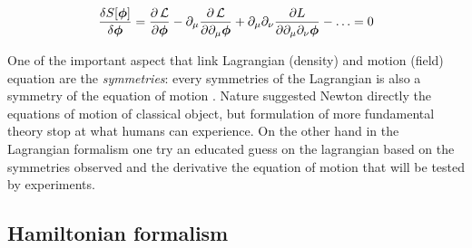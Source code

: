 \begin{equation} \label{eq:euler-lagrange-field}
  \frac{\delta S[\bm{\phi}]}{\delta \bm{\phi}} =
    \frac{\partial \operatorname{\mathcal{L}}}{\partial \bm{\phi}} -
    \partial_{\mu} \frac{\partial \operatorname{\mathcal{L}}}{\partial \partial_{\mu}\bm{\phi}} +
    \partial_{\mu}\partial_{\nu}\frac{\partial L}
    {\partial \partial_{\mu}\partial_{\nu}\bm{\phi}} -
    \ldots = 0
\end{equation}

One of the important aspect that link Lagrangian (density) and motion (field)
equation are the \emph{symmetries}: every symmetries of the Lagrangian is also a
symmetry of the equation of motion \cite{Aldrovandi19_symmetry}. Nature
suggested Newton directly the equations of motion of classical object, but
formulation of more fundamental theory stop at what humans can experience. On
the other hand in the Lagrangian formalism one try an educated guess on the
lagrangian based on the symmetries observed and the derivative the equation of
motion that will be tested by experiments.


\subsection{Hamiltonian formalism}

